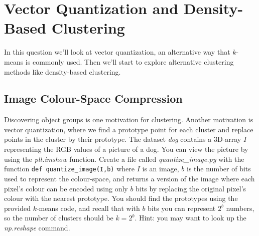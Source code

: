 \documentclass{article}
\begin{document}

\section{Vector Quantization and Density-Based Clustering}

In this question we'll look at vector quantization, an alternative way that $k$-means is commonly used. Then we'll start to explore alternative clustering methods like density-based clustering.

\subsection{Image Colour-Space Compression}

Discovering object groups is one motivation for clustering. Another motivation is vector quantization, where we find a prototype point for each cluster and replace points in the cluster by their prototype.
The dataset \emph{dog} contains a 3D-array $I$ representing the RGB values of a picture of a dog. You can view the picture by using the \emph{plt.imshow} function. Create a file called \emph{quantize\_image.py} with the function \verb|def quantize_image(I,b)| where $I$ is an image, $b$ is the number of bits used to represent the colour-space, and returns a version of the image where each pixel's colour can be encoded using only $b$ bits by replacing the original pixel's colour with the nearest prototype. You should find the prototypes using the provided $k$-means code, and recall that with $b$ bits you can represent $2^b$ numbers, so the number of clusters should be $k = 2^b$. Hint: you may want to look up the \emph{np.reshape} command.
\end{document}

